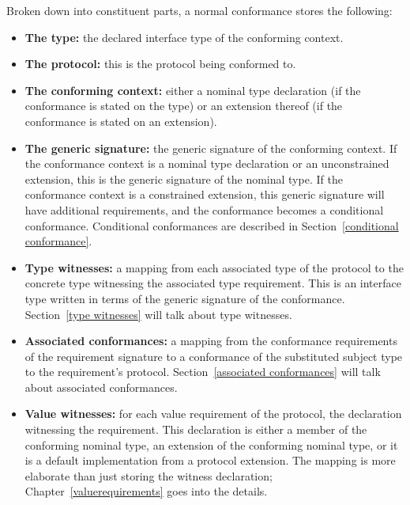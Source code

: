 \documentclass[a4paper,headsepline,bibliography=totoc,toc=flat,fleqn,twoside=semi]{scrbook}
\theoremstyle{definition}
\theoremstyle{definition}
\theoremstyle{definition}
\begin{document}
Broken down into constituent parts, a normal conformance stores the following:
\begin{itemize}
\item \textbf{The type:} the declared interface type of the conforming context.
\item \textbf{The protocol:} this is the protocol being conformed to.
\item \textbf{The conforming context:} either a nominal type declaration (if the conformance is stated on the type) or an extension thereof (if the conformance is stated on an extension).
\item \textbf{The generic signature:} the generic signature of the conforming context. If the conformance context is a nominal type declaration or an unconstrained extension, this is the generic signature of the nominal type. If the conformance context is a constrained extension, this generic signature will have additional requirements, and the conformance becomes a conditional conformance. Conditional conformances are described in Section~\ref{conditional conformance}.
\item \textbf{Type witnesses:} a mapping from each associated type of the protocol to the concrete type witnessing the associated type requirement. This is an interface type written in terms of the generic signature of the conformance. Section~\ref{type witnesses} will talk about type witnesses.
\item \textbf{Associated conformances:} a mapping from the conformance requirements of the requirement signature to a conformance of the substituted subject type to the requirement's protocol. Section~\ref{associated conformances} will talk about associated conformances.
\item \textbf{Value witnesses:} for each value requirement of the protocol, the declaration witnessing the requirement. This declaration is either a member of the conforming nominal type, an extension of the conforming nominal type, or it is a default implementation from a protocol extension. The mapping is more elaborate than just storing the witness declaration; Chapter~\ref{valuerequirements} goes into the details.
\end{itemize}

\end{document}
